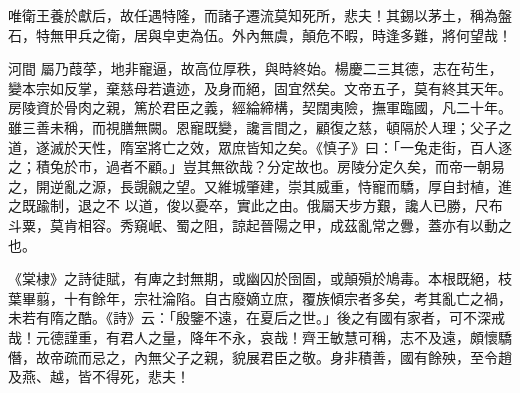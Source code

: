 \begin{pinyinscope}
 唯衛王養於獻后，故任遇特隆，而諸子遷流莫知死所，悲夫！其錫以茅土，稱為盤石，特無甲兵之衛，居與皁吏為伍。外內無虞，顛危不暇，時逢多難，將何望哉！



 河間
 屬乃葭莩，地非寵逼，故高位厚秩，與時終始。楊慶二三其德，志在茍生，變本宗如反掌，棄慈母若遺迹，及身而絕，固宜然矣。文帝五子，莫有終其天年。房陵資於骨肉之親，篤於君臣之義，經綸締構，契闊夷險，撫軍臨國，凡二十年。雖三善未稱，而視膳無闕。恩寵既變，讒言間之，顧復之慈，頓隔於人理；父子之道，遂滅於天性，隋室將亡之效，眾庶皆知之矣。《慎子》曰：「一兔走街，百人逐之；積兔於市，過者不顧。」豈其無欲哉？分定故也。房陵分定久矣，而帝一朝易之，開逆亂之源，長覬覦之望。又維城肇建，崇其威重，恃寵而驕，厚自封植，進之既踰制，退之不
 以道，俊以憂卒，實此之由。俄屬天步方艱，讒人已勝，尺布斗粟，莫肯相容。秀窺岷、蜀之阻，諒起晉陽之甲，成茲亂常之釁，蓋亦有以動之也。



 《棠棣》之詩徒賦，有庳之封無期，或幽囚於囹圄，或顛殞於鳩毒。本根既絕，枝葉畢翦，十有餘年，宗社淪陷。自古廢嫡立庶，覆族傾宗者多矣，考其亂亡之禍，未若有隋之酷。《詩》云：「殷鑒不遠，在夏后之世。」後之有國有家者，可不深戒哉！元德謹重，有君人之量，降年不永，哀哉！齊王敏慧可稱，志不及遠，頗懷驕僭，故帝疏而忌之，內無父子之親，貌展君臣之敬。身非積善，國有餘殃，至令趙及燕、越，皆不得死，悲夫！



\end{pinyinscope}